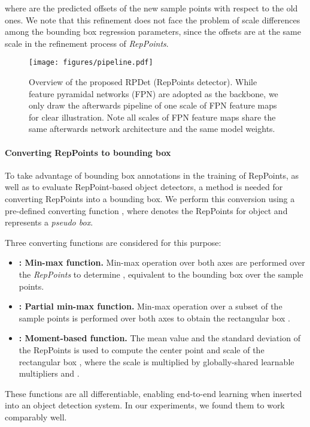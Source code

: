 \documentclass[10pt,twocolumn,letterpaper]{article}
\begin{document}
where  are the predicted offsets of the new sample points with respect to the old ones. We note that this refinement does not face the problem of scale differences among the bounding box regression parameters, since the offsets are at the same scale in the refinement process of \textit{RepPoints}.

\begin{figure*}[tb]
\centering
 \texttt{[image: figures/pipeline.pdf]}
\caption{Overview of the proposed RPDet (RepPoints detector). While feature pyramidal networks (FPN) \cite{FPN} are adopted as the backbone, we only draw the afterwards pipeline of one scale of FPN feature maps for clear illustration. Note all scales of FPN feature maps share the same afterwards network architecture and the same model weights.}
\vspace{-1em}
\label{fig::pipeline}
\end{figure*}
 
\vspace{-10pt}
\paragraph{Converting RepPoints to bounding box}
\label{sec::convert}
To take advantage of bounding box annotations in the training of RepPoints, as well as to evaluate RepPoint-based object detectors, a method is needed for converting RepPoints into a bounding box. We perform this conversion using a pre-defined converting function , where  denotes the RepPoints for object  and  represents a \textit{pseudo box}.

Three converting functions are considered for this purpose: 
\begin{itemize}
\item \textbf{: Min-max function.} Min-max operation over both axes are performed over the \textit{RepPoints} to determine , equivalent to the bounding box over the sample points.
\item \textbf{: Partial min-max function.} Min-max operation over a subset of the sample points is performed over both axes to obtain the rectangular box .
\item \textbf{: Moment-based function.} The mean value and the standard deviation of the RepPoints is used to compute the center point and scale of the rectangular box , where the scale is multiplied by globally-shared learnable multipliers  and .
\end{itemize}
These functions are all differentiable, enabling end-to-end learning when inserted into an object detection system. In our experiments, we found them to work comparably well.
\end{document}

